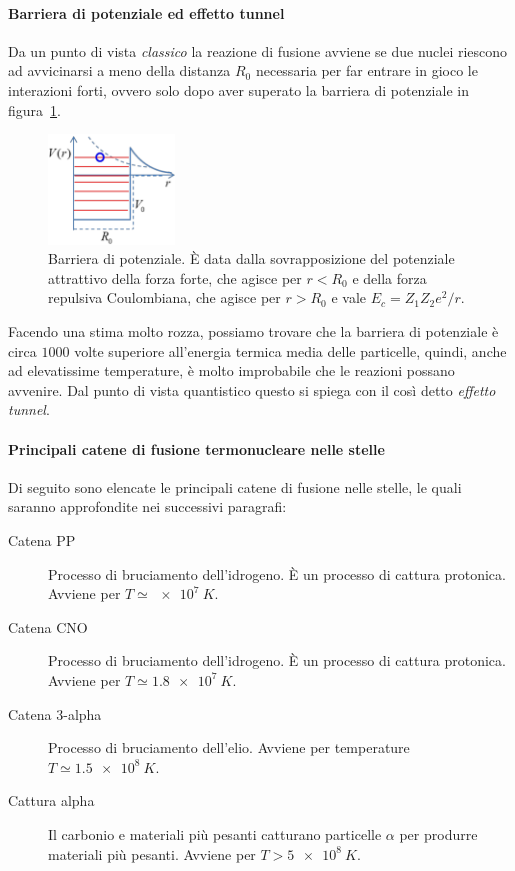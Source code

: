\paragraph{Barriera di potenziale ed effetto tunnel}
Da un punto di vista \emph{classico} la reazione di fusione avviene se due nuclei riescono ad avvicinarsi a meno della distanza $R_0$ necessaria per far entrare in gioco le interazioni forti, ovvero solo dopo aver superato la barriera di potenziale in figura~\ref{fig:barriera-potenziale}.

\begin{figure}
    \centering
    \includegraphics[width=0.3\textwidth]{immagini/barriera-potenziale.png}
    \caption{Barriera di potenziale. È data dalla sovrapposizione del potenziale attrattivo della forza forte, che agisce per $r < R_0$ e della forza repulsiva Coulombiana, che agisce per $r > R_0$ e vale $E_c = Z_1 Z_2 e^2 / r$.}
    \label{fig:barriera-potenziale}
\end{figure}

Facendo una stima molto rozza, possiamo trovare che la barriera di potenziale è circa $1000$ volte superiore all'energia termica media delle particelle, quindi, anche ad elevatissime temperature, è molto improbabile che le reazioni possano avvenire. Dal punto di vista quantistico questo si spiega con il così detto \emph{effetto tunnel}.

\paragraph{Principali catene di fusione termonucleare nelle stelle}
Di seguito sono elencate le principali catene di fusione nelle stelle, le quali saranno approfondite nei successivi paragrafi:
\begin{description}
    \item[Catena PP] Processo di bruciamento dell'idrogeno. È un processo di cattura protonica. Avviene per $T \simeq \SI{e7}{K}$.
    \item[Catena CNO] Processo di bruciamento dell'idrogeno. È un processo di cattura protonica. Avviene per $T \simeq \SI{1.8e7}{K}$.
    \item[Catena 3-alpha] Processo di bruciamento dell'elio. Avviene per temperature $T \simeq \SI{1.5e8}{K}$.
    \item[Cattura alpha] Il carbonio e materiali più pesanti catturano particelle $\alpha$ per produrre materiali più pesanti. Avviene per $T > \SI{5e8}{K}$.
\end{description}


